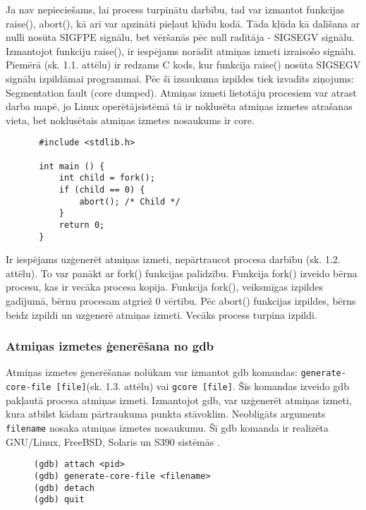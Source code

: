 Ja nav nepieciešams, lai process turpinātu darbību, tad var izmantot funkcijas raise(), abort(), kā arī var apzināti pieļaut kļūdu kodā.
Tāda kļūda kā dalīšana ar nulli nosūta SIGFPE signālu, bet vēršanās pēc null radītāja - SIGSEGV signālu.
Izmantojot funkciju raise(), ir iespējams norādīt atmiņas izmeti izraisošo signālu.
Piemērā (sk. 1.1. attēlu) ir redzams C kods, kur funkcija raise() nosūta SIGSEGV signālu izpildāmai programmai. 
Pēc šī izsaukuma izpildes tiek izvadīts ziņojums: Segmentation fault (core dumped).
Atmiņas izmeti lietotāju procesiem var atrast darba mapē, jo Linux operētājsistēmā tā ir noklusēta atmiņas izmetes atrašanas vieta, bet noklusētais atmiņas izmetes nosaukums ir core.
\begin{figure}[h]
\begin{lstlisting}
 #include <stdlib.h>

 int main () {
     int child = fork();
     if (child == 0) {
         abort(); /* Child */
     }
     return 0;
 }
 \end{lstlisting}
\caption{\textbf{\fontsize{11}{12}\selectfont {Atmiņas izmetes ģenerēšana, turpinot procesa darbību}}}
\end{figure}

Ir iespējams uzģenerēt atmiņas izmeti, nepārtraucot procesa darbību (sk. 1.2. attēlu). 
To var panākt ar fork() funkcijas palīdzību. Funkcija fork() izveido bērna procesu, kas ir vecāka procesa kopija.
Funkcija fork(), veiksmīgas izpildes gadījumā, bērnu procesam atgriež 0 vērtību. 
Pēc abort() funkcijas izpildes, bērns beidz izpildi un uzģenerē atmiņas izmeti. Vecāks process turpina izpildi.

\subsubsection{Atmiņas izmetes ģenerēšana no gdb}

Atmiņas izmetes ģenerēšanas nolūkam var izmantot gdb komandas: \texttt{generate-core-file [file]}(sk. 1.3. attēlu) vai \texttt{gcore [file]}. Šīs komandas izveido gdb pakļautā procesa atmiņas izmeti. 
Izmantojot gdb, var uzģenerēt atmiņas izmeti, kura atbilst kādam pārtraukuma punkta stāvoklim. 
Neobligāts arguments \texttt{filename} nosaka atmiņas izmetes nosaukumu. Šī gdb komanda ir realizēta GNU/Linux, FreeBSD, Solaris un S390 sistēmās \cite {gdb_gen_core}.
\begin{figure}[h]
\begin{lstlisting}[style=customgdb]
(gdb) attach <pid>
(gdb) generate-core-file <filename>
(gdb) detach
(gdb) quit
 \end{lstlisting}
\caption{\textbf{\fontsize{11}{12}\selectfont {Atmiņas izmetes ģenerēšana, izmantojot gdb}}}
\end{figure}


